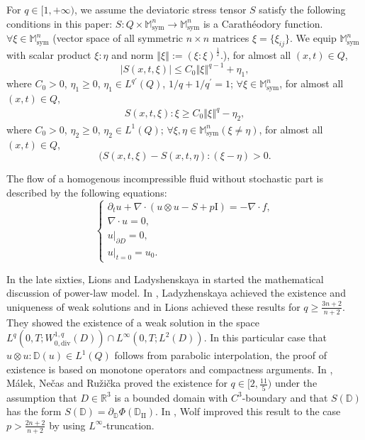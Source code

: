 \documentclass[reqno]{amsart}
\providecommand{\norm}[1]{\left\Vert#1\right\Vert}
\theoremstyle{definition}
\theoremstyle{remark}
\numberwithin{equation}{section} \allowdisplaybreaks
\begin{document}
 For $q\in [1,+\infty)$, we assume the
deviatoric stress tensor $S$ satisfy the following conditions in
this paper: $S:Q\times
\mathbb{M}_{\text{sym}}^n\rightarrow\mathbb{M}_{\text{sym}}^n$ is a
Carath\'{e}odory function. $\forall \xi\in
\mathbb{M}_{\text{sym}}^n$ (vector space of all symmetric $n\times
n$ matrices $\xi=\{\xi_{ij}\}$. We equip $\mathbb{M}_{\text{sym}}^n$
with scalar product $\xi:\eta$ and norm
$\norm{\xi}:=(\xi:\xi)^\frac{1}{2}$.), for almost
all $(x,t)\in Q$,
\begin{equation}\label{1.2}
|S(x,t,\xi)|\leq C_0\norm{\xi}^{q-1}+\eta_1,
\end{equation}
where $C_0>0$, $\eta_1\geq0$, $\eta_1\in L^{q'}(Q)$,
$1/q+1/{q^\prime}=1$; $\forall \xi\in \mathbb{M}_{\text{sym}}^n$,
for almost all $(x,t)\in Q$,
\begin{equation}\label{1.3}
\begin{split}
S(x,t,\xi):\xi\geq C_0\norm{\xi}^{q}-\eta_2,
\end{split}
\end{equation}
where $C_0>0$, $\eta_2\geq0$, $\eta_2\in L^{1}(Q)$; $\forall
\xi,\eta\in \mathbb{M}_{\text{sym}}^n(\xi\neq\eta)$, for almost all
$(x,t)\in Q$,
\begin{equation}\label{1.4}
(S(x,t,\xi)-S(x,t,\eta): (\xi-\eta)>0.
\end{equation}



The flow of a homogenous incompressible fluid without stochastic
part is described by the following equations:
\begin{equation}\label{1.5}
\begin{cases}
\partial_t u+\nabla\cdot(u\otimes u-S+p\text{I})=-\nabla\cdot f,\\
\nabla\cdot u=0,\\
u|_{\partial D}=0,\\
u|_{t=0}=u_0.
\end{cases}
\end{equation}

In the late sixties, Lions and Ladyshenskaya in
\cite{LOA1,LOA2,LOA3,LJL} started the mathematical discussion of
power-law model. In \cite{LOA1}, Ladyzhenskaya achieved the
existence and uniqueness of weak solutions and in \cite{LJL} Lions
achieved these results for $q\geq\frac{3n+2}{n+2}$. They showed the
existence of a weak solution in the space
$L^q(0,T;W^{1,q}_{0,\text{div}}(D))\cap L^{\infty}(0,T;L^2(D))$. In
this particular case that $u\otimes u:\mathbb{D}(u)\in L^1(Q) $
follows from parabolic interpolation, the proof of existence is
based on monotone operators and compactness arguments. In
\cite{JMJNMR}, M\'{a}lek, Ne\v{c}as and Ru\v{z}i\v{c}ka proved the
existence for $q\in [2,\frac{11}{5})$ under the assumption that
$D\in \mathbb{R}^3$ is a bounded domain with $C^3$-boundary and that
$S(\mathbb{D})$ has the form
$S(\mathbb{D})=\partial_\mathbb{D}\Phi(\mathbb{D}_{\textrm{II}}).$
In \cite{JW}, Wolf improved this result to the case
$p>\frac{2n+2}{n+2}$ by using $L^{\infty}$-truncation.
\end{document}
